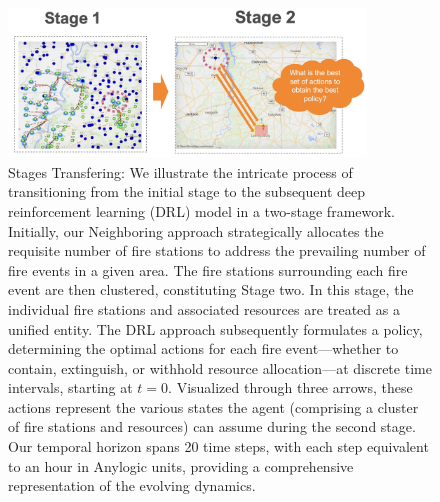 \documentclass[lettersize,journal]{IEEEtran}
\begin{document}
\begin{figure}[H]
  \centering
  \includegraphics[height=4cm,width=9.5cm]{figs/stages.png}
  \caption{Stages Transfering: We illustrate the intricate process of transitioning from the initial stage to the subsequent deep reinforcement learning (DRL) model in a two-stage framework. Initially, our Neighboring approach strategically allocates the requisite number of fire stations to address the prevailing number of fire events in a given area. The fire stations surrounding each fire event are then clustered, constituting Stage two. In this stage, the individual fire stations and associated resources are treated as a unified entity. The DRL approach subsequently formulates a policy, determining the optimal actions for each fire event—whether to contain, extinguish, or withhold resource allocation—at discrete time intervals, starting at $t=0$. Visualized through three arrows, these actions represent the various states the agent (comprising a cluster of fire stations and resources) can assume during the second stage. Our temporal horizon spans 20 time steps, with each step equivalent to an hour in Anylogic units, providing a comprehensive representation of the evolving dynamics.}\end{figure}
\end{document}
